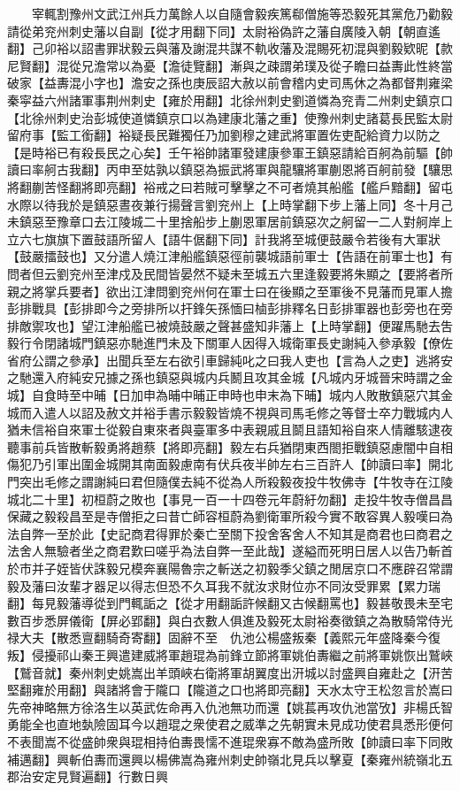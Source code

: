 　　宰輒割豫州文武江州兵力萬餘人以自隨會毅疾篤郗僧施等恐毅死其黨危乃勸毅請從弟兖州刺史藩以自副【從才用翻下同】太尉裕偽許之藩自廣陵入朝【朝直遙翻】己卯裕以詔書罪狀毅云與藩及謝混共謀不軌收藩及混賜死初混與劉毅欵昵【款尼賢翻】混從兄澹常以為憂【澹徒覽翻】漸與之疎謂弟璞及從子瞻曰益夀此性終當破家【益夀混小字也】澹安之孫也庚辰詔大赦以前會稽内史司馬休之為都督荆雍梁秦寜益六州諸軍事荆州刺史【雍於用翻】北徐州刺史劉道憐為兖青二州刺史鎮京口【北徐州刺史治彭城使道憐鎮京口以為建康北藩之重】使豫州刺史諸葛長民監太尉留府事【監工銜翻】裕疑長民難獨任乃加劉穆之建武將軍置佐吏配給資力以防之【是時裕已有殺長民之心矣】壬午裕帥諸軍發建康參軍王鎮惡請給百舸為前驅【帥讀曰率舸古我翻】丙申至姑孰以鎮惡為振武將軍與龍驤將軍蒯恩將百舸前發【驤思將翻蒯苦怪翻將即亮翻】裕戒之曰若賊可擊擊之不可者燒其船艦【艦戶黯翻】留屯水際以待我於是鎮惡晝夜兼行揚聲言劉兖州上【上時掌翻下步上藩上同】冬十月己未鎮惡至豫章口去江陵城二十里捨船步上蒯恩軍居前鎮惡次之舸留一二人對舸岸上立六七旗旗下置鼓語所留人【語牛倨翻下同】計我將至城便鼓嚴令若後有大軍狀【鼓嚴擂鼓也】又分遣人燒江津船艦鎮惡徑前襲城語前軍士【告語在前軍士也】有問者但云劉兖州至津戍及民間皆晏然不疑未至城五六里逢毅要將朱顯之【要將者所親之將掌兵要者】欲出江津問劉兖州何在軍士曰在後顯之至軍後不見藩而見軍人擔彭排戰具【彭排即今之旁排所以扞鋒矢孫愐曰樐彭排釋名日彭排軍器也彭旁也在旁排敵禦攻也】望江津船艦已被燒鼓嚴之聲甚盛知非藩上【上時掌翻】便躍馬馳去吿毅行令閉諸城門鎮惡亦馳進門未及下關軍人因得入城衛軍長史謝純入參承毅【僚佐省府公謂之參承】出聞兵至左右欲引車歸純叱之曰我人吏也【言為人之吏】逃將安之馳還入府純安兄據之孫也鎮惡與城内兵鬭且攻其金城【凡城内牙城晉宋時謂之金城】自食時至中晡【日加申為晡中晡正申時也申末為下晡】城内人敗散鎮惡穴其金城而入遣人以詔及赦文并裕手書示毅毅皆燒不視與司馬毛修之等督士卒力戰城内人猶未信裕自來軍士從毅自東來者與臺軍多中表親戚且鬬且語知裕自來人情離駭逮夜聽事前兵皆散斬毅勇將趙蔡【將即亮翻】毅左右兵猶閉東西閤拒戰鎮惡慮闇中自相傷犯乃引軍出圍金城開其南面毅慮南有伏兵夜半帥左右三百許人【帥讀曰率】開北門突出毛修之謂謝純曰君但隨僕去純不從為人所殺毅夜投牛牧佛寺【牛牧寺在江陵城北二十里】初桓蔚之敗也【事見一百一十四卷元年蔚紆勿翻】走投牛牧寺僧昌昌保藏之毅殺昌至是寺僧拒之曰昔亡師容桓蔚為劉衛軍所殺今實不敢容異人毅嘆曰為法自弊一至於此【史記商君得罪於秦亡至關下投舍客舍人不知其是商君也曰商君之法舍人無驗者坐之商君歎曰嗟乎為法自弊一至此哉】遂縊而死明日居人以告乃斬首於市并子姪皆伏誅毅兄模奔襄陽魯宗之斬送之初毅季父鎮之閒居京口不應辟召常謂毅及藩曰汝輩才器足以得志但恐不久耳我不就汝求財位亦不同汝受罪累【累力瑞翻】每見毅藩導從到門輒詬之【從才用翻詬許候翻又古候翻罵也】毅甚敬畏未至宅數百步悉屏儀衛【屏必郢翻】與白衣數人俱進及毅死太尉裕奏徵鎮之為散騎常侍光禄大夫【散悉亶翻騎奇寄翻】固辭不至　仇池公楊盛叛秦【義熙元年盛降秦今復叛】侵擾祁山秦王興遣建威將軍趙琨為前鋒立節將軍姚伯夀繼之前將軍姚恢出鷲峽【鷲音就】秦州刺史姚嵩出羊頭峽右衛將軍胡翼度出汧城以討盛興自雍赴之【汧苦堅翻雍於用翻】與諸將會于隴口【隴道之口也將即亮翻】天水太守王松忽言於嵩曰先帝神略無方徐洛生以英武佐命再入仇池無功而還【姚萇再攻仇池當攷】非楊氏智勇能全也直地埶險固耳今以趙琨之衆使君之威準之先朝實未見成功使君具悉形便何不表聞嵩不從盛帥衆與琨相持伯夀畏懦不進琨衆寡不敵為盛所敗【帥讀曰率下同敗補邁翻】興斬伯夀而還興以楊佛嵩為雍州刺史帥嶺北見兵以擊夏【秦雍州統嶺北五郡治安定見賢遍翻】行數日興